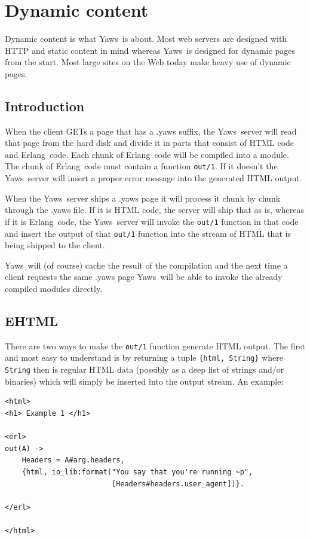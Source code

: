 \documentclass[11pt,oneside,english]{book}
\newcommand{\Erlang}            %
        {{\sc Erlang}}
\newcommand{\Yaws}            %
        {{\sc Yaws}}
\begin{document}
\chapter{Dynamic content}

Dynamic content is what \Yaws\  is about. Most web servers are designed
with HTTP and static content in mind whereas \Yaws\  is designed
for dynamic pages from the start.
Most large sites on the Web today make heavy use of dynamic pages.



\section{Introduction}

When the client GETs a page that has a .yaws suffix, the \Yaws\  server
will read that page from the hard disk and divide it in parts
that consist of HTML code and \Erlang\  code. Each chunk of \Erlang\  code
will be compiled into a module. The chunk of \Erlang\  code must contain
a function \verb+out/1+. If it doesn't the \Yaws\  server will insert a
proper error message into the generated HTML output.

When the \Yaws\  server ships a .yaws page it will process it chunk by chunk
through the .yaws file. If it is HTML code, the server will ship that
as is, whereas if it is \Erlang\  code, the \Yaws\  server will invoke the
\verb+out/1+ function in that code and insert the output of that \verb+out/1+ function into the stream
of HTML that is being shipped to the client.

\Yaws\  will (of course) cache the result of the compilation
and the next time a client requests the same .yaws page \Yaws\  will
be able to invoke the already compiled modules directly.


\section{EHTML}

There are two ways to make the \verb+out/1+ function generate HTML
output. The first and most easy to understand is by returning a tuple
\verb+{html, String}+ where \verb+String+ then is regular HTML data
(possibly as a deep list of strings and/or binaries) which will simply
be inserted into the output stream.
An example:

\begin{verbatim}
<html>
<h1> Example 1 </h1>

<erl>
out(A) ->
    Headers = A#arg.headers,
    {html, io_lib:format("You say that you're running ~p",
                         [Headers#headers.user_agent])}.

</erl>

</html>

\end{verbatim}
\end{document}
